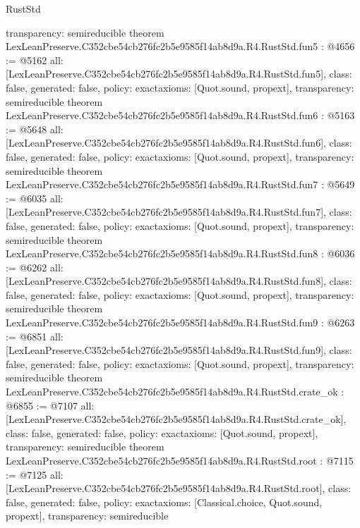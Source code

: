 \begin{lexlean}{RustStd}
\begin{coremodule}
{  transparency: semireducible
}
theorem LexLeanPreserve.C352cbe54cb276fc2b5e9585f14ab8d9a.R4.RustStd.fun5 : @4656 := @5162 {
  all: [LexLeanPreserve.C352cbe54cb276fc2b5e9585f14ab8d9a.R4.RustStd.fun5],
  class: false,
  generated: false,
  policy: exact{axioms: [Quot.sound, propext]},
  transparency: semireducible
}
theorem LexLeanPreserve.C352cbe54cb276fc2b5e9585f14ab8d9a.R4.RustStd.fun6 : @5163 := @5648 {
  all: [LexLeanPreserve.C352cbe54cb276fc2b5e9585f14ab8d9a.R4.RustStd.fun6],
  class: false,
  generated: false,
  policy: exact{axioms: [Quot.sound, propext]},
  transparency: semireducible
}
theorem LexLeanPreserve.C352cbe54cb276fc2b5e9585f14ab8d9a.R4.RustStd.fun7 : @5649 := @6035 {
  all: [LexLeanPreserve.C352cbe54cb276fc2b5e9585f14ab8d9a.R4.RustStd.fun7],
  class: false,
  generated: false,
  policy: exact{axioms: [Quot.sound, propext]},
  transparency: semireducible
}
theorem LexLeanPreserve.C352cbe54cb276fc2b5e9585f14ab8d9a.R4.RustStd.fun8 : @6036 := @6262 {
  all: [LexLeanPreserve.C352cbe54cb276fc2b5e9585f14ab8d9a.R4.RustStd.fun8],
  class: false,
  generated: false,
  policy: exact{axioms: [Quot.sound, propext]},
  transparency: semireducible
}
theorem LexLeanPreserve.C352cbe54cb276fc2b5e9585f14ab8d9a.R4.RustStd.fun9 : @6263 := @6851 {
  all: [LexLeanPreserve.C352cbe54cb276fc2b5e9585f14ab8d9a.R4.RustStd.fun9],
  class: false,
  generated: false,
  policy: exact{axioms: [Quot.sound, propext]},
  transparency: semireducible
}
theorem LexLeanPreserve.C352cbe54cb276fc2b5e9585f14ab8d9a.R4.RustStd.crate_ok : @6855 := @7107 {
  all: [LexLeanPreserve.C352cbe54cb276fc2b5e9585f14ab8d9a.R4.RustStd.crate_ok],
  class: false,
  generated: false,
  policy: exact{axioms: [Quot.sound, propext]},
  transparency: semireducible
}
theorem LexLeanPreserve.C352cbe54cb276fc2b5e9585f14ab8d9a.R4.RustStd.root : @7115 := @7125 {
  all: [LexLeanPreserve.C352cbe54cb276fc2b5e9585f14ab8d9a.R4.RustStd.root],
  class: false,
  generated: false,
  policy: exact{axioms: [Classical.choice, Quot.sound, propext]},
  transparency: semireducible
}


\end{coremodule}
\end{lexlean}

